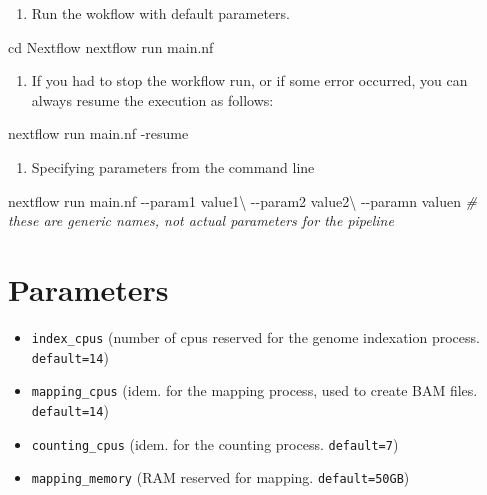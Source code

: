 \documentclass[
  openany]{book}
\newenvironment{Shaded}{\begin{snugshade}}{\end{snugshade}}
\newcommand{\AttributeTok}[1]{\textcolor[rgb]{0.77,0.63,0.00}{#1}}
\newcommand{\BuiltInTok}[1]{#1}
\newcommand{\CommentTok}[1]{\textcolor[rgb]{0.56,0.35,0.01}{\textit{#1}}}
\newcommand{\DataTypeTok}[1]{\textcolor[rgb]{0.13,0.29,0.53}{#1}}
\newcommand{\ExtensionTok}[1]{#1}
\newcommand{\NormalTok}[1]{#1}
\providecommand{\tightlist}{%
  \setlength{\itemsep}{0pt}\setlength{\parskip}{0pt}}
\begin{document}
\begin{enumerate}
\def\labelenumi{\arabic{enumi}.}
\setcounter{enumi}{2}
\tightlist
\item
  Run the wokflow with default parameters.
\end{enumerate}

\begin{Shaded}
\begin{Highlighting}[]
\BuiltInTok{cd}\NormalTok{ Nextflow}
\ExtensionTok{nextflow}\NormalTok{ run main.nf}
\end{Highlighting}
\end{Shaded}

\begin{enumerate}
\def\labelenumi{\arabic{enumi}.}
\setcounter{enumi}{3}
\tightlist
\item
  If you had to stop the workflow run, or if some error occurred, you can always resume the execution as follows:
\end{enumerate}

\begin{Shaded}
\begin{Highlighting}[]
\ExtensionTok{nextflow}\NormalTok{ run main.nf }\AttributeTok{{-}resume}
\end{Highlighting}
\end{Shaded}

\begin{enumerate}
\def\labelenumi{\arabic{enumi}.}
\setcounter{enumi}{4}
\tightlist
\item
  Specifying parameters from the command line
\end{enumerate}

\begin{Shaded}
\begin{Highlighting}[]
\ExtensionTok{nextflow}\NormalTok{ run main.nf }\AttributeTok{{-}{-}param1}\NormalTok{ value1}\DataTypeTok{\textbackslash{}}
\NormalTok{{-}{-}param2 value2}\DataTypeTok{\textbackslash{}}
\NormalTok{{-}{-}paramn valuen }\CommentTok{\# these are generic names, not actual parameters for the pipeline}
\end{Highlighting}
\end{Shaded}

\hypertarget{parameters}{%
\chapter{Parameters}\label{parameters}}

\begin{itemize}
\tightlist
\item
  \texttt{index\_cpus} (number of cpus reserved for the genome indexation process. \texttt{default=14})
\item
  \texttt{mapping\_cpus} (idem. for the mapping process, used to create BAM files. \texttt{default=14})
\item
  \texttt{counting\_cpus} (idem. for the counting process. \texttt{default=7})
\item
  \texttt{mapping\_memory} (RAM reserved for mapping. \texttt{default=50GB})
\end{itemize}
\end{document}
